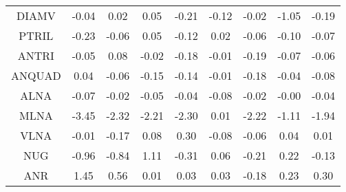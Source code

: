 \begin{longtable}{ | c || c | c | c | c | c | c | c || c |}
DIAMV &  \cellcolor[HTML]{FFFFFF} -0.04 &  \cellcolor[HTML]{FFFFFF} 0.02 &  \cellcolor[HTML]{FFFFFF} 0.05 &  \cellcolor[HTML]{FFF7F7} -0.21 &  \cellcolor[HTML]{FFFFFF} -0.12 &  \cellcolor[HTML]{FFFFFF} -0.02 &  \cellcolor[HTML]{FFE7E7} -1.05 &  \cellcolor[HTML]{FFF7F7} -0.19 \\
PTRIL &  \cellcolor[HTML]{FFF7F7} -0.23 &  \cellcolor[HTML]{FFFFFF} -0.06 &  \cellcolor[HTML]{FFFFFF} 0.05 &  \cellcolor[HTML]{FFFFFF} -0.12 &  \cellcolor[HTML]{FFFFFF} 0.02 &  \cellcolor[HTML]{FFFFFF} -0.06 &  \cellcolor[HTML]{FFFFFF} -0.10 &  \cellcolor[HTML]{FFFFFF} -0.07 \\
ANTRI &  \cellcolor[HTML]{FFFFFF} -0.05 &  \cellcolor[HTML]{FFFFFF} 0.08 &  \cellcolor[HTML]{FFFFFF} -0.02 &  \cellcolor[HTML]{FFF7F7} -0.18 &  \cellcolor[HTML]{FFFFFF} -0.01 &  \cellcolor[HTML]{FFF7F7} -0.19 &  \cellcolor[HTML]{FFFFFF} -0.07 &  \cellcolor[HTML]{FFFFFF} -0.06 \\
ANQUAD &  \cellcolor[HTML]{FFFFFF} 0.04 &  \cellcolor[HTML]{FFFFFF} -0.06 &  \cellcolor[HTML]{FFFFFF} -0.15 &  \cellcolor[HTML]{FFFFFF} -0.14 &  \cellcolor[HTML]{FFFFFF} -0.01 &  \cellcolor[HTML]{FFF7F7} -0.18 &  \cellcolor[HTML]{FFFFFF} -0.04 &  \cellcolor[HTML]{FFFFFF} -0.08 \\
ALNA &  \cellcolor[HTML]{FFFFFF} -0.07 &  \cellcolor[HTML]{FFFFFF} -0.02 &  \cellcolor[HTML]{FFFFFF} -0.05 &  \cellcolor[HTML]{FFFFFF} -0.04 &  \cellcolor[HTML]{FFFFFF} -0.08 &  \cellcolor[HTML]{FFFFFF} -0.02 &  \cellcolor[HTML]{FFFFFF} -0.00 &  \cellcolor[HTML]{FFFFFF} -0.04 \\
MLNA &  \cellcolor[HTML]{FFA7A7} -3.45 &  \cellcolor[HTML]{FFC7C7} -2.32 &  \cellcolor[HTML]{FFC7C7} -2.21 &  \cellcolor[HTML]{FFC7C7} -2.30 &  \cellcolor[HTML]{FFFFFF} 0.01 &  \cellcolor[HTML]{FFC7C7} -2.22 &  \cellcolor[HTML]{FFDFDF} -1.11 &  \cellcolor[HTML]{FFCFCF} -1.94 \\
VLNA &  \cellcolor[HTML]{FFFFFF} -0.01 &  \cellcolor[HTML]{FFF7F7} -0.17 &  \cellcolor[HTML]{FFFFFF} 0.08 &  \cellcolor[HTML]{F7F7FF} 0.30 &  \cellcolor[HTML]{FFFFFF} -0.08 &  \cellcolor[HTML]{FFFFFF} -0.06 &  \cellcolor[HTML]{FFFFFF} 0.04 &  \cellcolor[HTML]{FFFFFF} 0.01 \\
NUG &  \cellcolor[HTML]{FFE7E7} -0.96 &  \cellcolor[HTML]{FFE7E7} -0.84 &  \cellcolor[HTML]{DFDFFF} 1.11 &  \cellcolor[HTML]{FFF7F7} -0.31 &  \cellcolor[HTML]{FFFFFF} 0.06 &  \cellcolor[HTML]{FFF7F7} -0.21 &  \cellcolor[HTML]{F7F7FF} 0.22 &  \cellcolor[HTML]{FFFFFF} -0.13 \\
ANR &  \cellcolor[HTML]{D7D7FF} 1.45 &  \cellcolor[HTML]{EFEFFF} 0.56 &  \cellcolor[HTML]{FFFFFF} 0.01 &  \cellcolor[HTML]{FFFFFF} 0.03 &  \cellcolor[HTML]{FFFFFF} 0.03 &  \cellcolor[HTML]{FFF7F7} -0.18 &  \cellcolor[HTML]{F7F7FF} 0.23 &  \cellcolor[HTML]{F7F7FF} 0.30 \\

\end{longtable}
